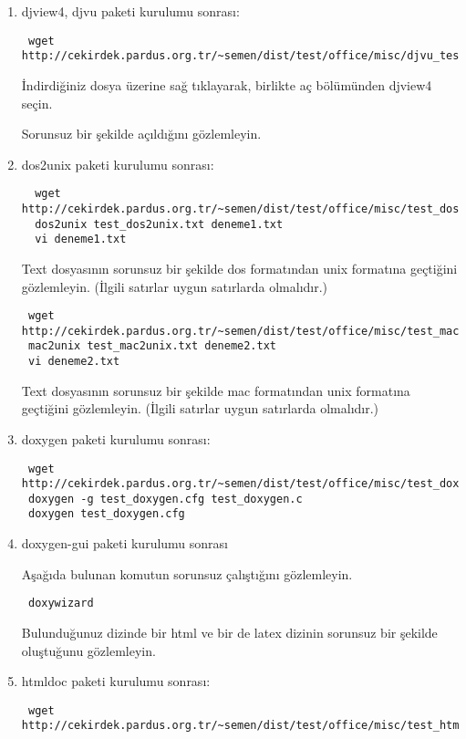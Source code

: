 \documentclass[a4paper,10pt]{article}
\begin{document}
\begin{enumerate}
\item djview4, djvu paketi kurulumu sonrası:
\begin{verbatim}
 wget http://cekirdek.pardus.org.tr/~semen/dist/test/office/misc/djvu_test.djvu
\end{verbatim}

İndirdiğiniz dosya üzerine sağ tıklayarak, birlikte aç bölümünden djview4 seçin. 

Sorunsuz bir şekilde açıldığını gözlemleyin.

\item dos2unix paketi kurulumu sonrası:
\begin{verbatim}
  wget http://cekirdek.pardus.org.tr/~semen/dist/test/office/misc/test_dos2unix.txt
  dos2unix test_dos2unix.txt deneme1.txt
  vi deneme1.txt
\end{verbatim}
Text dosyasının sorunsuz bir şekilde dos formatından unix formatına geçtiğini gözlemleyin. (İlgili satırlar uygun satırlarda olmalıdır.)

\begin{verbatim}
 wget http://cekirdek.pardus.org.tr/~semen/dist/test/office/misc/test_mac2unix.txt
 mac2unix test_mac2unix.txt deneme2.txt
 vi deneme2.txt
\end{verbatim}
Text dosyasının sorunsuz bir şekilde mac formatından unix formatına geçtiğini gözlemleyin. (İlgili satırlar uygun satırlarda olmalıdır.)

\item doxygen paketi kurulumu sonrası:
\begin{verbatim}
 wget http://cekirdek.pardus.org.tr/~semen/dist/test/office/misc/test_doxgen.c
 doxygen -g test_doxygen.cfg test_doxygen.c
 doxygen test_doxygen.cfg
\end{verbatim}

\item doxygen-gui paketi kurulumu sonrası

Aşağıda bulunan komutun sorunsuz çalıştığını gözlemleyin.
\begin{verbatim}
 doxywizard
\end{verbatim}

Bulunduğunuz dizinde bir html ve bir de latex dizinin sorunsuz bir şekilde oluştuğunu gözlemleyin.

\item htmldoc paketi kurulumu sonrası:
\begin{verbatim}
 wget http://cekirdek.pardus.org.tr/~semen/dist/test/office/misc/test_htmldoc.html
\end{verbatim}


\end{enumerate}
\end{document}
